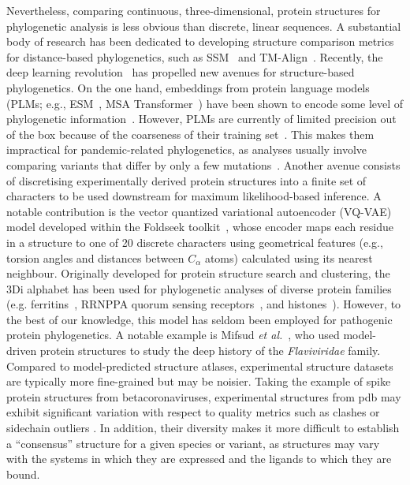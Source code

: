 Nevertheless, comparing continuous, three-dimensional, protein structures for phylogenetic analysis is less obvious than discrete, linear sequences. A substantial body of research has been dedicated to developing structure comparison metrics for distance-based phylogenetics, such as SSM~\cite{krissinel2004} and TM-Align~\cite{zhang2005}. Recently, the deep learning revolution~\cite{lecun2015} has propelled new avenues for structure-based phylogenetics. On the one hand, embeddings from protein language models (PLMs; e.g., ESM~\cite{lin2023, hayes2025}, MSA Transformer~\cite{rao2021}) have been shown to encode some level of phylogenetic information~\cite{lupo2022, tule2025}. However, PLMs are currently of limited precision out of the box because of the coarseness of their training set~\cite{gomez2024}. This makes them impractical for pandemic-related phylogenetics, as analyses usually involve comparing variants that differ by only a few mutations~\cite{markov2023}. Another avenue consists of discretising experimentally derived protein structures into a finite set of characters to be used downstream for maximum likelihood-based inference. A notable contribution is the vector quantized variational autoencoder (VQ-VAE) model developed within the Foldseek toolkit~\cite{vankempen2024}, whose encoder maps each residue in a structure to one of 20 discrete characters using geometrical features (e.g., torsion angles and distances between $C_\alpha$ atoms) calculated using its nearest neighbour. Originally developed for protein structure search and clustering, the 3Di alphabet has been used for phylogenetic analyses of diverse protein families (e.g. ferritins~\cite{puente2023}, RRNPPA quorum sensing receptors~\cite{moi2023}, and histones~\cite{fullmer2025}). However, to the best of our knowledge, this model has seldom been employed for pathogenic protein phylogenetics. A notable example is Mifsud \textit{et al.}~\cite{mifsud2024}, who used model-driven protein structures to study the deep history of the \textit{Flaviviridae} family. Compared to model-predicted structure atlases, experimental structure datasets are typically more fine-grained but may be noisier. Taking the example of spike protein structures from betacoronaviruses, experimental structures from \gls{pdb} may exhibit significant variation with respect to quality metrics such as clashes or sidechain outliers \cite{gore2017}. In addition, their diversity makes it more difficult to establish a “consensus” structure for a given species or variant, as structures may vary with the systems in which they are expressed and the ligands to which they are bound.

